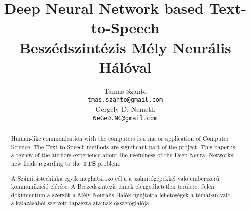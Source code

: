 \documentclass{article}
\title{Deep Neural Network based Text-to-Speech
	\\
	Beszédszintézis Mély Neurális Hálóval}
\author{
	Tamas Szanto\\
	\texttt{tmas.szanto@gmail.com} \\
	\AND
	Gergely D. Nemeth\\
	\texttt{NeGeD.NG@gmail.com} \\
}
\begin{document}

\maketitle
\chapter{}
\begin{abstract}
  Human-like communication with the computers is a major application of Computer Science. The Text-to-Speech methods are significant part of the project. This paper is a review of the authors experience about the usefulness of the Deep Neural Networks' new fields regarding to the \textbf{TTS} problem.
\end{abstract}

\begin{abstract}
	A Számítástechinka egyik meghatározó célja a számítógépekkel való emberszerű kommunikáció elérése. A Beszédszintézis ennek elengedhetetlen területe. Jelen dokumentum a szerzők a Mély Neurális Hálók nyújtotta lehetőségek a témában való alkalazásából szerzett tapasztalatainak összefoglalója. 
\end{abstract}

\clearpage

\chapter{}

\chapter{}
\clearpage

\clearpage
\chapter{}

\clearpage
\chapter{}

\clearpage
\chapter{}


\clearpage
\chapter{}

\chapter{}

\end{document}
